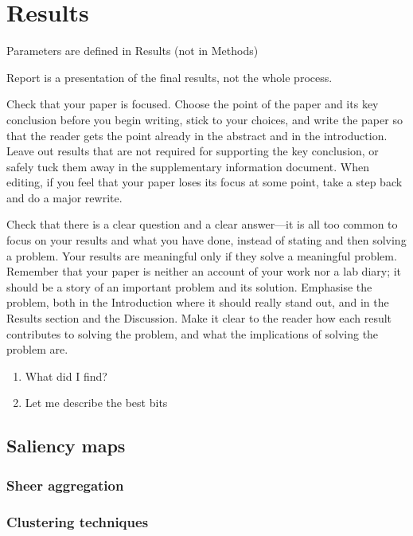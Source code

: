 \chapter{Results} \label{Chapter: Results}

Parameters are defined in Results (not in Methods)

Report is a presentation of the final results, not the whole process.

Check that your paper is focused. Choose the point of the paper and its key conclusion before you begin writing, stick to your choices, and write the paper so that the reader gets the point already in the abstract and in the introduction. Leave  out results that are not required for supporting the key conclusion, or safely tuck them away in the supplementary information document. When editing, if you feel that your paper loses its focus at some point, take a step back and do a major rewrite.

Check that there is a clear question and a clear answer—it is all too common to focus on your results and what you have done, instead of stating and then solving a problem. Your results are meaningful only if they solve a meaningful problem. Remember that your paper is neither an account of your work nor a lab diary; it should be a story of an important problem and its solution. Emphasise the problem, both in the Introduction where it should really stand out, and in the Results section and the Discussion. Make it clear to the reader how each result contributes to solving the problem, and what the implications of solving the problem are.

\begin{enumerate}
\item What did I find?
\item Let me describe the best bits
\end{enumerate}


\section{Saliency maps}

\subsection{Sheer aggregation}

\subsection{Clustering techniques}
